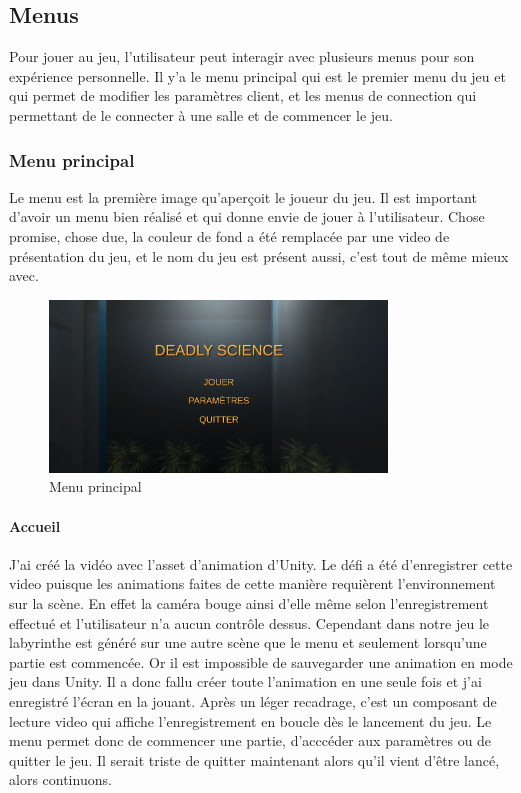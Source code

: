 \documentclass{article}
\begin{document}
\subsection{Menus}
Pour jouer au  jeu, l'utilisateur peut interagir avec plusieurs menus pour son expérience personnelle. Il y'a le menu principal qui est le premier menu du jeu et qui permet de modifier les paramètres client, et les menus de connection qui permettant de le connecter à une salle et de commencer le jeu.
\subsubsection{Menu principal}

Le menu est la première image qu'aperçoit le joueur du jeu. Il est important d'avoir un menu bien réalisé et qui donne envie de jouer à l'utilisateur. Chose promise, chose due, la couleur de fond a été remplacée par une video de présentation du jeu, et le nom du jeu est présent aussi, c'est tout de même mieux avec.

\begin{figure}[!h]
	\centering
	\includegraphics[width=0.8\textwidth]{MainMenu.png}
	\caption{Menu principal}
	\label{Menu principal}
\end{figure}

\paragraph{Accueil}
J'ai créé la vidéo avec l'asset d'animation d'Unity. Le défi a été d'enregistrer cette video puisque les animations faites de cette manière requièrent l'environnement sur la scène. En effet la caméra bouge ainsi d'elle même selon l'enregistrement effectué et l'utilisateur n'a aucun contrôle dessus. Cependant dans notre jeu le labyrinthe est généré sur une autre scène que le menu et seulement lorsqu'une partie est commencée. Or il est impossible de sauvegarder une animation en mode jeu dans Unity. Il a donc fallu créer toute l'animation en une seule fois et j'ai enregistré l'écran en la jouant. Après un léger recadrage, c'est un composant de lecture video qui affiche l'enregistrement en boucle dès le lancement du jeu.
\newline
Le menu permet donc de commencer une partie, d'acccéder aux paramètres ou de quitter le jeu. Il serait triste de quitter maintenant alors qu'il vient d'être lancé, alors continuons.
\end{document}
